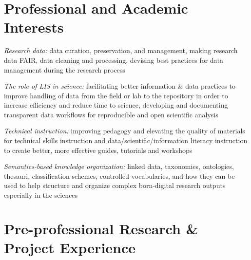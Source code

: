 \documentclass[12pt,letterpaper]{report}
\newcommand{\listitemspace}{0.25em}
\renewenvironment{itemize}
{\begin{list}{}{\setlength{\leftmargin}{0em}
            \setlength{\parskip}{0em}
            \setlength{\itemsep}{\listitemspace}
            \setlength{\parsep}{\listitemspace}}}
{\end{list}}
\begin{document}
\section*{Professional and Academic Interests}

\begin{itemize}

	\item \textit{Research data:} data curation, preservation, and management, making research data FAIR, data cleaning and processing, devising best practices for data management during the research process

	\item \textit{The role of LIS in science:} facilitating better information \& data practices to improve handling of data from the field or lab to the repository in order to increase efficiency and reduce time to science, developing and documenting transparent data workflows for reproducible and open scientific analysis

	\item \textit{Technical instruction:} improving pedagogy and elevating the quality of materials for technical skills instruction and data/scientific/information literacy instruction to create better, more effective guides, tutorials and workshops

	\item \textit{Semantics-based knowledge organization:} linked data, taxonomies, ontologies, thesauri, classification schemes, controlled vocabularies, and how they can be used to help structure and organize complex born-digital research outputs especially in the sciences

\end{itemize}



\section*{Pre-professional Research \& Project Experience}
\end{document}
